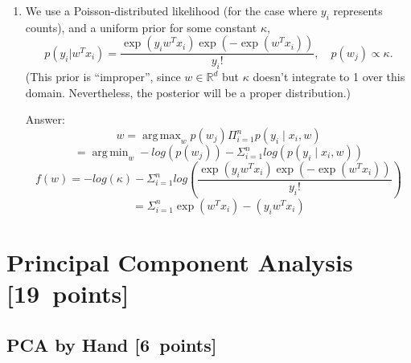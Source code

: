 \documentclass{article}
\newenvironment{answer}{\par\begingroup\color{gre}Answer: }{\endgroup}
\newcommand\pts[1]{\textcolor{pointscolour}{[#1~points]}}
\def\R{\mathbb{R}}
\begin{document}
\begin{enumerate}
\begin{answer}
\[    \]
    \[
    = \frac\lambda2 ||w - \mu||_2^2 +\frac{\nu+1}{2}\Sigma^n_{i=1}log\left(1 + \frac{(w^T x_i - y_i)^2}{\nu} \right) 
    \]
\end{answer}
\newpage
\item We use a Poisson-distributed likelihood (for the case where $y_i$ represents counts), and a uniform prior for some constant $\kappa$,
\[
p(y_i | w^Tx_i) = \frac{\exp(y_iw^Tx_i)\exp(-\exp(w^Tx_i))}{y_i!}, \quad p(w_j) \propto \kappa.
\]
(This prior is 	``improper'', since $w\in\R^d$ but $\kappa$ doesn't integrate to 1 over this domain. Nevertheless, the posterior will be a proper distribution.)
\begin{answer}
    \[
    w = \mathop{\mathrm{arg\,max}}_w p(w_j)\Pi^n_{i=1}p(y_i \mid x_i,w)
    \]
    \[
    = \mathop{\mathrm{arg\,min}}_w -log(p(w_j))-\Sigma^n_{i=1}log(p(y_i \mid x_i,w))
    \]
    \[
    f(w) = -log(\kappa)-\Sigma^n_{i=1}log(\frac{\exp(y_iw^Tx_i)\exp(-\exp(w^Tx_i))}{y_i!}) 
    \]
    \[
    = \Sigma^n_{i=1}\exp(w^Tx_i)-(y_iw^Tx_i)
    \]
\end{answer}
\end{enumerate}


\clearpage
\section{Principal Component Analysis \pts{19}}
\subsection{PCA by Hand \pts{6}}
\end{document}
